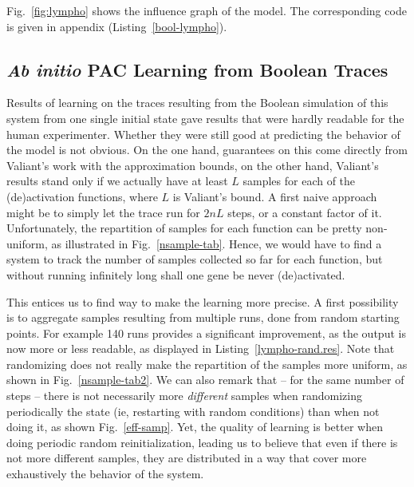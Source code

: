 \documentclass{llncs}
\newif\ifcomments%
\newcommand{\sylvain}[1]{\ifcomments\textcolor{green}{#1}\fi}
\begin{document}
Fig.~\ref{fig:lympho} shows the influence graph of the model. The
corresponding code is given in appendix (Listing~\ref{bool-lympho}).

\subsection{\emph{Ab initio} PAC Learning from Boolean Traces}
\label{sec:abinitio}

Results of learning on the traces resulting from the Boolean simulation of this system from one single initial state gave results that were hardly readable for the human experimenter. Whether they were still good at predicting the behavior of the model is not obvious. On the one hand, guarantees on this come directly from Valiant's work with the approximation bounds, on the other hand,  
Valiant's results stand only if we actually have at least $L$ samples for each of the (de)activation functions, where $L$ is Valiant's bound. A first naive approach might be to simply let the trace run for $2nL$ steps, or a constant factor of it. Unfortunately, the repartition of samples for each function can be pretty non-uniform, as illustrated in Fig.~\ref{nsample-tab}. Hence, we would have to find a system to track the number of samples collected so far for each function, but without running infinitely long shall one gene be never (de)activated.


This entices us to find way to make the learning more precise. A first possibility is to aggregate samples resulting from multiple runs, done from random starting points. For example 140 runs provides a significant improvement, as the output is now more or less readable, as displayed in Listing~\ref{lympho-rand.res}. Note that randomizing does not really make the repartition of the samples more uniform, as shown in Fig.~\ref{nsample-tab2}. We can also remark that -- for the same number of steps -- there is not necessarily more \emph{different} samples when randomizing periodically the state (ie, restarting with random conditions) than when not doing it, as shown Fig.~\ref{eff-samp}. Yet, the quality of learning is better when doing periodic random reinitialization, leading us to believe that even if there is not more different samples, they are distributed in a way that cover more exhaustively the behavior of the system.

\sylvain{not sure if all this is not biased by the spurious added
activations/inhibitions. See Fig.~\ref{fig:statistics}.}
\end{document}
